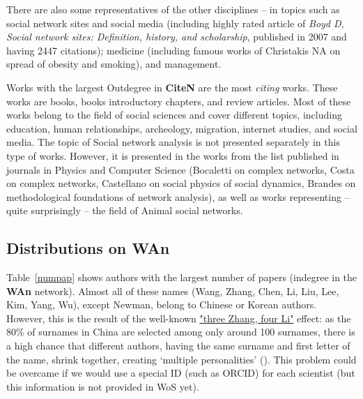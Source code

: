 \documentclass[11pt]{article} %
\newcommand{\Remark}[1]{\ifodd\value{page} \normalmarginpar
 \else \reversemarginpar \fi \marginpar{{\footnotesize #1}} }
\begin{document}
There are also some representatives of the other disciplines -- in  topics such as social network sites and social media (including highly rated article of \textit{Boyd D, Social network sites: Definition, history, and scholarship}, published in 2007 and having 2447 citations); medicine (including famous works of Christakis NA on spread of obesity and smoking), and management. \medskip 

Works with the largest Outdegree in \textbf{CiteN} are the most \emph{citing} works. These works are books, books introductory chapters, and review articles. Most of these works belong to the field of social sciences and cover different topics, including education, human relationships, archeology, migration, internet studies, and social media. The topic of Social network analysis is not presented separately in this type of works. However, it is presented in the works from the list published in journals in Physics and Computer Science (Bocaletti on complex networks, Costa on complex networks, Castellano on social physics of social dynamics, Brandes on methodological foundations of network analysis), as well as works representing -- quite surprisingly -- the field of Animal social networks.

\subsection{Distributions on WAn}

\Remark{remove Table 4?}
Table~\ref{numpap} shows authors with the largest number of papers (indegree in the \textbf{WAn} network). Almost all of these names (Wang, Zhang, Chen, Li, Liu, Lee, Kim, Yang, Wu), except Newman, belong to Chinese or Korean authors. However, this is the result of the well-known \href{https://en.wikipedia.org/wiki/List_of_common_Chinese_surnames}{"three Zhang, four Li"} effect: as the 80\% of surnames in China are selected among only around 100 surnames, there is a high chance that different authors, having the same surname and first letter of the name, shrink together, creating `multiple personalities' (\cite{harzing2015}). This problem could be overcame if we would use a special ID (such as ORCID) for each scientist (but this information is not provided in WoS yet). \medskip 
\end{document}
